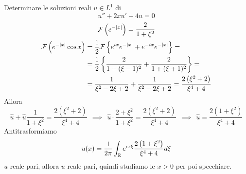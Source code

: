 Determinare le soluzioni reali $u\in L^{1}$ di
\begin{equation*}
u'' + 2xu' + 4u = 0
\end{equation*}
\ParteSoluzioni
\Soluzione
\begin{gather*}
\mathcal{F} \left(e^{- | x|}\right) = \frac{2}{1 + \xi^{2}}\\
\begin{aligned}
\mathcal{F} \left(e^{- | x|}\cos x\right) & = \frac{1}{2}\mathcal{F} \left\{e^{ix} e^{- | x|} + e^{- ix} e^{- | x|}\right\} = \\
 & = \frac{1}{2}\left\{\frac{2}{1 + (\xi - 1)^{2}} + \frac{2}{1 + (\xi + 1)^{2}}\right\} = \\
 & = \frac{1}{\xi^{2} - 2\xi + 2} + \frac{1}{\xi^{2} - 2\xi + 2} = \frac{2\left(\xi^{2} + 2\right)}{\xi^{4} + 4}
\end{aligned}
\end{gather*}
Allora
\begin{equation*}
\hat{u} + \hat{u}\frac{1}{1 + \xi^{2}} = \frac{2\left(\xi^{2} + 2\right)}{\xi^{4} + 4} \ \ \implies \ \ \hat{u} \cdot \frac{2 + \xi^{2}}{1 + \xi^{2}} = \frac{2\left(\xi^{2} + 2\right)}{\xi^{4} + 4} \ \ \implies \ \ \hat{u} = \frac{2\left(1 + \xi^{2}\right)}{\xi^{4} + 4}
\end{equation*}
Antitrasformiamo
\begin{equation*}
u(x) = \frac{1}{2\pi}\int_{\mathbb{R}} e^{ix\xi}\frac{2\left(1 + \xi^{2}\right)}{\xi^{4} + 4} d\xi 
\end{equation*}
$\hat{u}$ reale pari, allora $u$ reale pari, quindi studiamo le $x > 0$ per poi specchiare.


